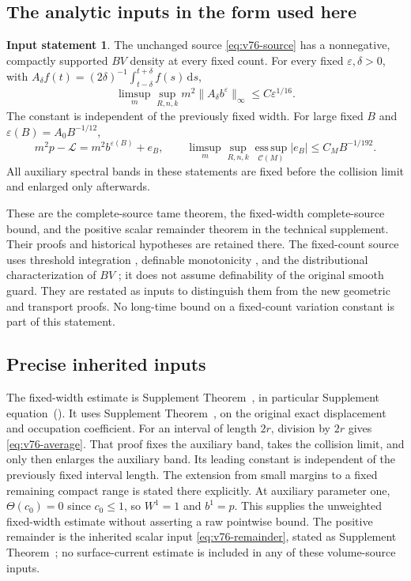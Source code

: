 \documentclass[11pt,reqno]{amsart}
\numberwithin{equation}{section}
\theoremstyle{definition}\newtheorem{definition}[theorem]{Definition}
\theoremstyle{remark}\newtheorem{remark}[theorem]{Remark}
\newcommand{\dd}{\,\mathrm d}\newcommand{\one}{\mathbf1}
\theoremstyle{definition}\newtheorem{inputstatement}[theorem]{Input statement}
\newcommand{\esssup}{\operatorname*{ess\,sup}}
\begin{document}
\subsection{The analytic inputs in the form used here}
\begin{inputstatement}\label{input:v76-analytic}
The unchanged source \eqref{eq:v76-source} has a nonnegative,
compactly supported $BV$ density at every fixed count. For every
fixed $\varepsilon,\delta>0$, with
$A_\delta f(t)=(2\delta)^{-1}\int_{t-\delta}^{t+\delta}f(s)\dd s$,
\begin{equation}\label{eq:v76-average}
 \limsup_m\sup_{R,n,k}m^2\|A_\delta b^\varepsilon\|_\infty
                                      \le C\varepsilon^{1/16}.
\end{equation}
The constant is independent of the previously fixed width. For large
fixed $B$ and $\varepsilon(B)=A_0B^{-1/12}$,
\begin{equation}\label{eq:v76-remainder}
 m^2p-\mathcal L=m^2b^{\varepsilon(B)}+e_B,\qquad
 \limsup_m\sup_{R,n,k}\esssup_{\mathcal C(M)}|e_B|
                                     \le C_MB^{-1/192}.
\end{equation}
All auxiliary spectral bands in these statements are fixed before
the collision limit and enlarged only afterwards.
\end{inputstatement}
These are the complete-source tame theorem, the fixed-width
complete-source bound, and the positive scalar remainder theorem in
the technical supplement. Their proofs and historical hypotheses are
retained there. The fixed-count source uses threshold integration
\cite{CMInt}, definable monotonicity \cite{Coste}, and the
distributional characterization of $BV$ \cite{AFP}; it does not
assume definability of the original smooth guard. They are restated as inputs to distinguish them from
the new geometric and transport proofs. No long-time bound on a
fixed-count variation constant is part of this statement.



\subsection{Precise inherited inputs}\label{sec:v79-input-map}
The fixed-width estimate is Supplement Theorem~,
in particular Supplement equation~\textup{()}.
It uses Supplement Theorem~, on the
original exact displacement and occupation coefficient. For an interval
of length $2r$, division by $2r$ gives \eqref{eq:v76-average}. That
proof fixes the auxiliary band, takes the collision limit, and only
then enlarges the auxiliary band. Its leading constant is independent
of the previously fixed interval length. The extension from small
margins to a fixed remaining compact range is stated there explicitly.
At auxiliary parameter one, $\Theta(c_0)=0$ since $c_0\le1$, so $W^1=1$
and $b^1=p$. This supplies the unweighted fixed-width estimate without
asserting a raw pointwise bound. The positive remainder is the inherited
scalar input \eqref{eq:v76-remainder}, stated as Supplement
Theorem~; no surface-current estimate is
included in any of these volume-source inputs.
\end{document}

